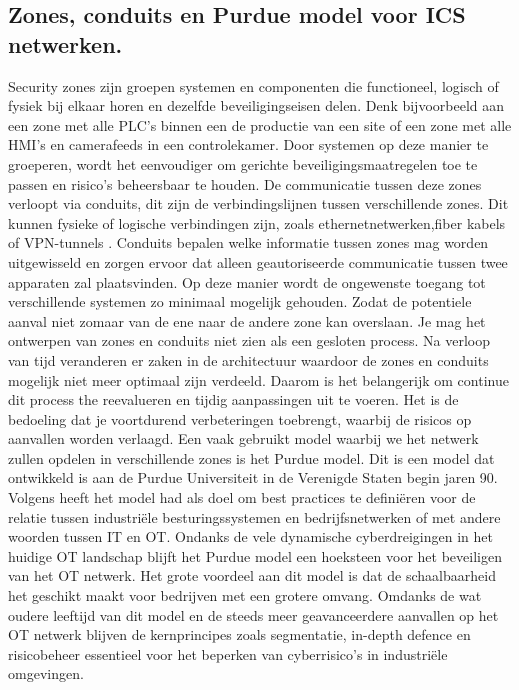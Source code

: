\subsection{Zones, conduits en Purdue model voor ICS netwerken.}
Security zones zijn groepen systemen en componenten die functioneel, logisch of fysiek bij elkaar horen en dezelfde beveiligingseisen delen. Denk bijvoorbeeld aan een zone met alle PLC’s binnen een de productie van een site of een zone met alle HMI’s en camerafeeds in een controlekamer. Door systemen op deze manier te groeperen, wordt het eenvoudiger om gerichte beveiligingsmaatregelen toe te passen en risico’s beheersbaar te houden. De communicatie tussen deze zones verloopt via conduits, dit zijn de verbindingslijnen tussen verschillende zones. Dit kunnen fysieke of logische verbindingen zijn, zoals ethernetnetwerken,fiber kabels of VPN-tunnels . Conduits bepalen welke informatie tussen zones mag worden uitgewisseld en zorgen ervoor dat alleen geautoriseerde communicatie tussen twee apparaten zal plaatsvinden. Op deze manier wordt de ongewenste toegang tot verschillende systemen zo minimaal mogelijk gehouden. Zodat de potentiele aanval niet zomaar van de ene naar de andere zone kan overslaan. \autocite{Dragos2023}
Je mag het ontwerpen van zones en conduits niet zien als een gesloten process. Na verloop van tijd veranderen er zaken in de architectuur waardoor de zones en conduits mogelijk niet meer optimaal zijn verdeeld. Daarom is het belangerijk om continue dit process the reevalueren en tijdig aanpassingen uit te voeren. Het is de bedoeling dat je voortdurend verbeteringen toebrengt, waarbij de risicos op aanvallen worden verlaagd. \autocite{Incibe2018}
Een vaak gebruikt model waarbij we het netwerk zullen opdelen in verschillende zones is het Purdue model. Dit is een model dat ontwikkeld is aan de Purdue Universiteit in de Verenigde Staten begin jaren 90. Volgens \textcite{Mathezer2021}heeft het model had als doel om best practices te definiëren voor de relatie tussen industriële besturingssystemen en bedrijfsnetwerken of met andere woorden tussen IT en OT. 
Ondanks de vele dynamische cyberdreigingen in het huidige OT landschap blijft het Purdue model een hoeksteen voor het beveiligen van het OT netwerk. Het grote voordeel aan dit model is dat de schaalbaarheid het geschikt maakt voor bedrijven met een grotere omvang. Omdanks de wat oudere leeftijd van dit model en de steeds meer geavanceerdere aanvallen op het OT netwerk blijven de kernprincipes zoals segmentatie, in-depth defence en risicobeheer essentieel voor het beperken van cyberrisico's in industriële omgevingen.

